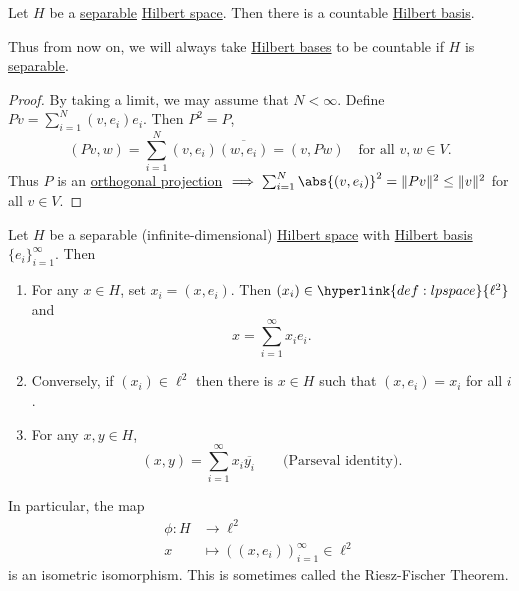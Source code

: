 \documentclass{article}
\begin{document}
\begin{cor}
    Let $H$ be a \hyperlink{def:separable}{separable} \hyperlink{def:euclidean}{Hilbert space}. Then there is a countable \hyperlink{def:ons}{Hilbert basis}.
\end{cor}
Thus from now on, we will always take \hyperlink{def:ons}{Hilbert bases} to be countable if $H$ is \hyperlink{def:separable}{separable}.


\begin{proof}
    By taking a limit, we may assume that $N < \infty$. Define $Pv = \sum_{i=1}^N (v, e_i) e_i$. Then $P^2 = P$,
    \begin{equation*}
        (Pv, w) = \sum_{i=1}^N (v, e_i) \overline{(w, e_i)} = (v, Pw) \quad \text{for all } v, w \in V.
    \end{equation*}
    Thus $P$ is an \hyperlink{def:proj}{orthogonal projection} $\implies \sum_{i=1}^N \abs{(v, e_i)}^2 = \|Pv\|^2 \leq \|v\|^2$ for all $v \in V$.
\end{proof}

\begin{prop}
    Let $H$ be a separable (infinite-dimensional) \hyperlink{def:euclidean}{Hilbert space} with \hyperlink{def:ons}{Hilbert basis} $\{e_i\}_{i=1}^\infty$. Then
    \begin{enumerate}[label=(\roman*)]
        \item For any $x \in H$, set $x_i = (x, e_i)$. Then $(x_i) \in \hyperlink{def:lpspace}{\ell^2}$ and
            \begin{equation*}
                x = \sum_{i=1}^\infty x_i e_i.
            \end{equation*}
        \item Conversely, if $(x_i) \in \ell^2$ then there is $x \in H$ such that $(x, e_i) = x_i$ for all $i$.
        \item For any $x, y \in H$,
            \begin{equation*}
                (x, y) = \sum_{i=1}^\infty x_i \overline{y_i} \qquad \text{(Parseval identity)}.
            \end{equation*}
    \end{enumerate}
    In particular, the map
    \begin{align*}
        \phi: H &\longrightarrow \ell^2 \\
        x &\longmapsto ((x, e_i))_{i=1}^\infty \in \ell^2
    \end{align*}
    is an isometric isomorphism. This is sometimes called the Riesz-Fischer Theorem.
\end{prop}
\end{document}
